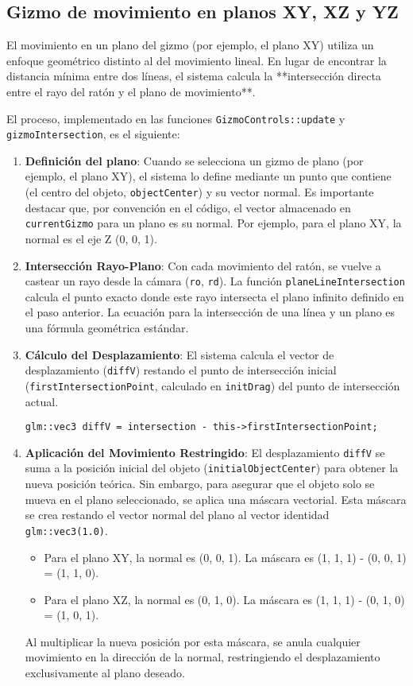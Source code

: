 \subsection{Gizmo de movimiento en planos XY, XZ y YZ}

El movimiento en un plano del gizmo (por ejemplo, el plano XY) utiliza un
enfoque geométrico distinto al del movimiento lineal. En lugar de encontrar la
distancia mínima entre dos líneas, el sistema calcula la **intersección directa
entre el rayo del ratón y el plano de movimiento**.

El proceso, implementado en las funciones \texttt{GizmoControls::update} y
\texttt{gizmoIntersection}, es el siguiente:

\begin{enumerate}
    \item \textbf{Definición del plano}: Cuando se selecciona un gizmo de plano (por ejemplo, el plano XY), el sistema lo define mediante un punto que contiene (el centro del objeto, \texttt{objectCenter}) y su vector normal. Es importante destacar que, por convención en el código, el vector almacenado en \texttt{currentGizmo} para un plano es su normal. Por ejemplo, para el plano XY, la normal es el eje Z (0, 0, 1).
    \item \textbf{Intersección Rayo-Plano}: Con cada movimiento del ratón, se vuelve a castear un rayo desde la cámara (\texttt{ro}, \texttt{rd}). La función \texttt{planeLineIntersection} calcula el punto exacto donde este rayo intersecta el plano infinito definido en el paso anterior. La ecuación para la intersección de una línea y un plano es una fórmula geométrica estándar.
    \item \textbf{Cálculo del Desplazamiento}: El sistema calcula el vector de desplazamiento (\texttt{diffV}) restando el punto de intersección inicial (\texttt{firstIntersectionPoint}, calculado en \texttt{initDrag}) del punto de intersección actual.
          \begin{verbatim}
glm::vec3 diffV = intersection - this->firstIntersectionPoint;
    \end{verbatim}
    \item \textbf{Aplicación del Movimiento Restringido}: El desplazamiento \texttt{diffV} se suma a la posición inicial del objeto (\texttt{initialObjectCenter}) para obtener la nueva posición teórica. Sin embargo, para asegurar que el objeto solo se mueva en el plano seleccionado, se aplica una máscara vectorial. Esta máscara se crea restando el vector normal del plano al vector identidad \texttt{glm::vec3(1.0)}.
          \begin{itemize}
              \item Para el plano XY, la normal es (0, 0, 1). La máscara es (1, 1, 1) - (0, 0, 1) =
                    (1, 1, 0).
              \item Para el plano XZ, la normal es (0, 1, 0). La máscara es (1, 1, 1) - (0, 1, 0) =
                    (1, 0, 1).
          \end{itemize}
          Al multiplicar la nueva posición por esta máscara, se anula cualquier movimiento en la dirección de la normal, restringiendo el desplazamiento exclusivamente al plano deseado.
\end{enumerate}

